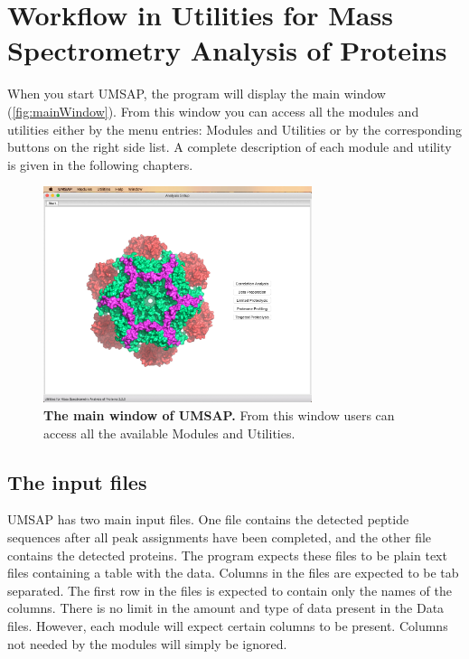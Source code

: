 \chapter{Workflow in Utilities for Mass Spectrometry Analysis of Proteins}
\label{chap:workflow}

When you start UMSAP, the program will display the main window (\autoref{fig:mainWindow}).
From this window you can access all the modules and utilities either by the menu
entries: Modules and Utilities or by the corresponding buttons on the right side
list. A complete description of each module and utility is given in the following
chapters.

\begin{figure}[h]
	\centering
	\includegraphics[width=0.7\textwidth]{./IMAGES/MAIN-WINDOW/mainwindow.jpg}
	\caption[The main window of UMSAP]{\textbf{The main window of UMSAP.} From
this window users can access all the available Modules and Utilities.} 
	\label{fig:mainWindow}
	\vspace{-5pt}
\end{figure}  

\section{The input files}
\label{sec:dataFile}

UMSAP has two main input files. One file contains the detected peptide sequences
after all peak assignments have been completed, and the other file contains the
detected proteins. The program expects these files to be plain text files containing
a table with the data. Columns in the files are expected to be tab separated. The
first row in the files is expected to contain only the names of the columns. There
is no limit in the amount and type of data present in the Data files. However, each
module will expect certain columns to be present. Columns not needed by the modules
will simply be ignored.

